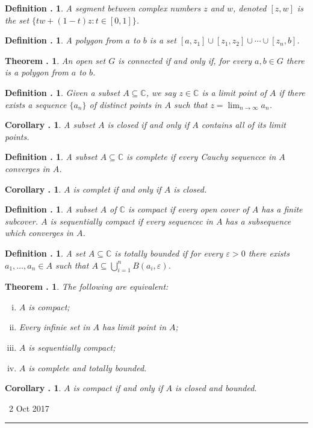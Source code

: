 \documentclass[twoside]{report}
\newcommand{\C}{\mathbb{C}}
\newcounter{Lecture}
\newcommand{\newLec}[1]{
  \stepcounter{Lecture}
  \noindent{\Large\bf Lecture \arabic{Lecture}} \, #1 \hfill  \rule[1ex]{2.5in}{.1pt} \vspace{1em}
}
\theoremstyle{myts}
\newcounter{c}[Lecture]
\newtheorem{dfn}[c]{Definition \arabic{Lecture}.}
\newtheorem{thm}[c]{Theorem \arabic{Lecture}.}
\newtheorem{cor}[c]{Corollary \arabic{Lecture}.}
\newcounter{ex}[Lecture]
\begin{document}
\begin{dfn}
  A \emph{segment} between complex numbers $z$ and $w$, denoted \( [z,w] \) is the set \( \{ tw + (1-t)z : t\in [0,1] \} \).
\end{dfn}

\begin{dfn}
  A \emph{polygon} from $a$ to $b$ is a set \( [a,z_1] \cup [z_1,z_2] \cup \cdots \cup [z_n,b] \).
\end{dfn}

\begin{thm}
  An open set $G$ is connected if and only if, for every \(a,b\in G\) there is a polygon from $a$ to $b$.
\end{thm}

\begin{dfn}
  Given a subset \( A\subseteq \C\), we say \(z\in\C\) is a \emph{limit point} of $A$ if there exists a sequence \(\{a_n\}\) of distinct points in $A$ such that \( z = \lim_{n\to\infty} a_n \).
\end{dfn}

\begin{cor}
  A subset $A$ is closed if and only if $A$ contains all of its limit points.
\end{cor}

\begin{dfn}
  A subset \(A \subseteq\C\) is \emph{complete} if every Cauchy sequencce in $A$ converges in $A$.
\end{dfn}

\begin{cor}
  $A$ is complet if and only if $A$ is closed.
\end{cor}

\begin{dfn}
  A subset $A$ of $\C$ is \emph{compact} if every open cover of $A$ has a finite subcover. $A$ is \emph{sequentially compact} if every sequencec in $A$ has a subsequence which converges in $A$. 
\end{dfn}

\begin{dfn}
  A set \(A\subseteq\C\) is \emph{totally bounded} if for every \(\varepsilon > 0\) there exists \( a_1, \ldots, a_n \in A \) such that \( A\subseteq \bigcup_{i=1}^n B(a_i, \varepsilon)\). 
\end{dfn}

\begin{thm}
  The following are equivalent:
  \begin{enumerate}[(i)]
    \item $A$ is compact;
    \item Every infinie set in $A$ has limit point in $A$;
    \item $A$ is sequentially compact;
    \item $A$ is complete and totally bounded.
  \end{enumerate}
\end{thm}

\begin{cor}
  $A$ is compact if and only if $A$ is closed and bounded.
\end{cor}

\newLec{2 Oct 2017}
\end{document}
